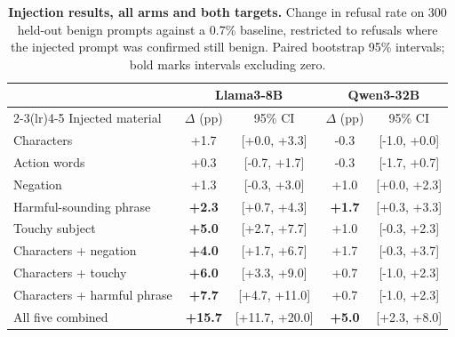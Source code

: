 \begin{table}[t]
\centering\small
\caption{\textbf{Injection results, all arms and both targets.} Change in refusal rate on 300 held-out benign prompts against a 0.7\% baseline, restricted to refusals where the injected prompt was confirmed still benign. Paired bootstrap 95\% intervals; bold marks intervals excluding zero.}
\label{tab:injection-full}
\begin{tabular}{lcccc}
\toprule
& \multicolumn{2}{c}{Llama3-8B} & \multicolumn{2}{c}{Qwen3-32B} \\
\cmidrule(lr){2-3}\cmidrule(lr){4-5}
Injected material & $\Delta$ (pp) & 95\% CI & $\Delta$ (pp) & 95\% CI \\
\midrule
Characters & +1.7 & [+0.0, +3.3] & -0.3 & [-1.0, +0.0] \\
Action words & +0.3 & [-0.7, +1.7] & -0.3 & [-1.7, +0.7] \\
Negation & +1.3 & [-0.3, +3.0] & +1.0 & [+0.0, +2.3] \\
Harmful-sounding phrase & \textbf{+2.3} & [+0.7, +4.3] & \textbf{+1.7} & [+0.3, +3.3] \\
Touchy subject & \textbf{+5.0} & [+2.7, +7.7] & +1.0 & [-0.3, +2.3] \\
\midrule
Characters + negation & \textbf{+4.0} & [+1.7, +6.7] & +1.7 & [-0.3, +3.7] \\
Characters + touchy & \textbf{+6.0} & [+3.3, +9.0] & +0.7 & [-1.0, +2.3] \\
Characters + harmful phrase & \textbf{+7.7} & [+4.7, +11.0] & +0.7 & [-1.0, +2.3] \\
All five combined & \textbf{+15.7} & [+11.7, +20.0] & \textbf{+5.0} & [+2.3, +8.0] \\
\bottomrule
\end{tabular}
\end{table}

